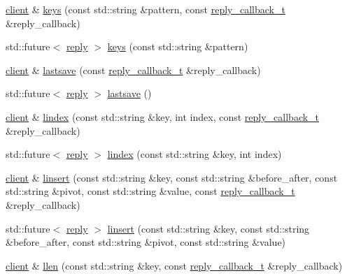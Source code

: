 \begin{DoxyCompactItemize}
\hyperlink{classcpp__redis_1_1client}{client} \& \hyperlink{classcpp__redis_1_1client_acb7845a206b2321e6919c2f38282c322}{keys} (const std\+::string \&pattern, const \hyperlink{classcpp__redis_1_1client_a061a1140d36d2eaeda82b09a0bb3f9f2}{reply\+\_\+callback\+\_\+t} \&reply\+\_\+callback)
\item 
std\+::future$<$ \hyperlink{classcpp__redis_1_1reply}{reply} $>$ \hyperlink{classcpp__redis_1_1client_a1c0804cab9251acde742e725d0af6cbf}{keys} (const std\+::string \&pattern)
\item 
\hyperlink{classcpp__redis_1_1client}{client} \& \hyperlink{classcpp__redis_1_1client_a3b25eaf2691051156748abb69e1b0317}{lastsave} (const \hyperlink{classcpp__redis_1_1client_a061a1140d36d2eaeda82b09a0bb3f9f2}{reply\+\_\+callback\+\_\+t} \&reply\+\_\+callback)
\item 
std\+::future$<$ \hyperlink{classcpp__redis_1_1reply}{reply} $>$ \hyperlink{classcpp__redis_1_1client_a6b550a4ecf6eb33abffd664c3124b4f9}{lastsave} ()
\item 
\hyperlink{classcpp__redis_1_1client}{client} \& \hyperlink{classcpp__redis_1_1client_afa409d5b28466837137dfb12c3554070}{lindex} (const std\+::string \&key, int index, const \hyperlink{classcpp__redis_1_1client_a061a1140d36d2eaeda82b09a0bb3f9f2}{reply\+\_\+callback\+\_\+t} \&reply\+\_\+callback)
\item 
std\+::future$<$ \hyperlink{classcpp__redis_1_1reply}{reply} $>$ \hyperlink{classcpp__redis_1_1client_a58458ef30b1fb49584395b6f8584b931}{lindex} (const std\+::string \&key, int index)
\item 
\hyperlink{classcpp__redis_1_1client}{client} \& \hyperlink{classcpp__redis_1_1client_a80799f12e6aafe07872b2bbea453db53}{linsert} (const std\+::string \&key, const std\+::string \&before\+\_\+after, const std\+::string \&pivot, const std\+::string \&value, const \hyperlink{classcpp__redis_1_1client_a061a1140d36d2eaeda82b09a0bb3f9f2}{reply\+\_\+callback\+\_\+t} \&reply\+\_\+callback)
\item 
std\+::future$<$ \hyperlink{classcpp__redis_1_1reply}{reply} $>$ \hyperlink{classcpp__redis_1_1client_ab8d167d78e3c956fd1ade0e2f992f46a}{linsert} (const std\+::string \&key, const std\+::string \&before\+\_\+after, const std\+::string \&pivot, const std\+::string \&value)
\item 
\hyperlink{classcpp__redis_1_1client}{client} \& \hyperlink{classcpp__redis_1_1client_a2e0a911a6bb87224896b7c33da7ac058}{llen} (const std\+::string \&key, const \hyperlink{classcpp__redis_1_1client_a061a1140d36d2eaeda82b09a0bb3f9f2}{reply\+\_\+callback\+\_\+t} \&reply\+\_\+callback)

\end{DoxyCompactItemize}
